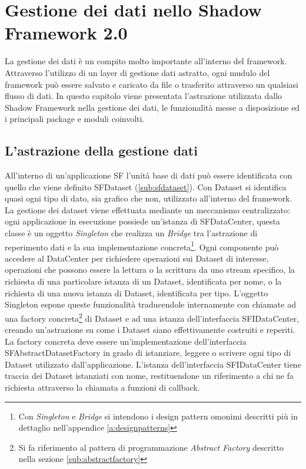 
\chapter{Gestione dei dati nello Shadow Framework 2.0}
\label{ch:gestionedati}

La gestione dei dati è un compito molto importante all'interno del framework. Attraverso l'utilizzo di un layer di gestione dati astratto, ogni mudulo del framework può essere salvato e caricato da file o trasferito attraverso un qualsiasi flusso di dati.
In questo capitolo viene presentata l'astrazione utilizzata dallo Shadow Framework nella gestione dei dati, le funzionalità messe a disposizione ed i principali package e moduli coinvolti.

\section{L'astrazione della gestione dati}
\label{sec:astrazione}
All'interno di un'applicazione \ac{SF} l'unità base di dati può essere identificata con quello che viene definito SFDataset (\ref{sub:sfdataset}). Con Dataset si identifica quasi ogni tipo di dato, sia grafico che non, utilizzato all'interno del framework.
La gestione dei dataset viene effettuata mediante un meccanismo centralizzato: ogni applicazione in esecuzione possiede un'istanza di SFDataCenter, questa classe è un oggetto \textit{Singleton} che realizza un \textit{Bridge}
tra l'astrazione di reperimento dati e la sua implementazione concreta\footnote{Con \textit{Singleton} e \textit{Bridge} si intendono i design pattern omonimi descritti più in dettaglio nell'appendice \ref{a:designpatterns}}.
Ogni componente può accedere al DataCenter per richiedere operazioni sui Dataset di interesse, operazioni che possono essere la lettura o la scrittura da uno stream specifico, la richiesta di una particolare istanza di un Dataset, identificata per nome, o la richiesta di una nuova istanza di Dataset, identificata per tipo.
L'oggetto Singleton espone queste funzionalità traducendole internamente con chiamate ad una factory concreta\footnote{Si fa riferimento al pattern di programmazione \textit{Abstract Factory} descritto nella sezione \ref{sub:abstractfactory}}
di Dataset e ad una istanza dell'interfaccia SFIDataCenter, creando un'astrazione su come i Dataset siano effettivamente costruiti e reperiti.
La factory concreta deve essere un'implementazione dell'interfaccia SFAbstractDatasetFactory in grado di istanziare, leggere o scrivere ogni tipo di Dataset utilizzato dall'applicazione.
L'istanza dell'interfaccia SFIDataCenter tiene traccia dei Dataset istanziati con nome, restituendone un riferimento a chi ne fa richiesta attraverso la chiamata a funzioni di callback.

